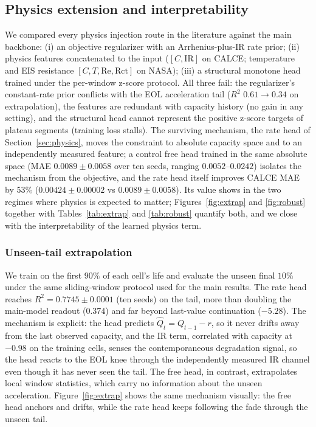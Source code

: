 \subsection{Physics extension and interpretability}
\label{sec:phys}

We compared every physics injection route in the literature against
the main backbone: (i) an objective regularizer with an
Arrhenius-plus-IR rate prior; (ii) physics features concatenated to
the input ($[C,\mathrm{IR}]$ on CALCE; temperature and EIS
resistance $[C,T,\mathrm{Re},\mathrm{Rct}]$ on NASA); (iii) a
structural monotone head trained under the per-window z-score
protocol. All three fail: the regularizer's constant-rate prior
conflicts with the EOL acceleration tail ($R^2$ $0.61\to0.34$ on
extrapolation), the features are redundant with capacity history (no
gain in any setting), and the structural head cannot represent the
positive z-score targets of plateau segments (training loss stalls).
The surviving mechanism, the rate head of
Section~\ref{sec:physics}, moves the constraint to absolute
capacity space and to an independently measured feature; a control
free head trained in the same absolute space (MAE
$0.0089\pm0.0058$ over ten seeds, ranging $0.0052$--$0.0242$)
isolates the mechanism from the objective, and the rate head
itself improves CALCE MAE by 53\% ($0.00424\pm0.00002$ vs
$0.0089\pm0.0058$). Its value shows in the
two regimes where physics is expected to matter;
Figures~\ref{fig:extrap} and \ref{fig:robust} together with
Tables~\ref{tab:extrap} and \ref{tab:robust} quantify both, and we
close with the interpretability of the learned physics term.

\subsubsection{Unseen-tail extrapolation}

We train on the first $90\%$ of each cell's life and evaluate the
unseen final $10\%$ under the same sliding-window protocol used for
the main results. The rate head reaches $R^2 = 0.7745\pm0.0001$ (ten seeds)
on the tail, more than doubling the main-model readout
($0.374$) and far
beyond last-value continuation ($-5.28$). The mechanism is explicit:
the head predicts $\hat{Q}_t = Q_{t-1} - r$, so it never drifts
away from the last observed capacity, and the IR term, correlated
with capacity at $-0.98$ on the training cells, senses the
contemporaneous degradation signal, so the head reacts to the EOL
knee through the independently measured IR channel even though it
has never seen the tail. The free head, in contrast, extrapolates
local window statistics, which carry no information about the
unseen acceleration. Figure~\ref{fig:extrap} shows the same
mechanism visually: the free head anchors and drifts, while the
rate head keeps following the fade through the unseen tail.

